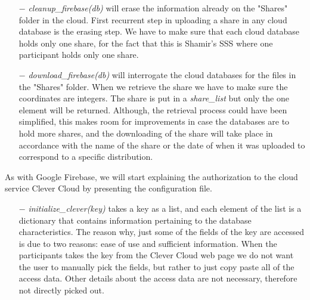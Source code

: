 \documentclass[12pt, a4paper, oneside]{book}
\begin{document}
    \vspace{-0.5cm}
    \begin{itemize}
        \item[$-$] {\it cleanup\_firebase(db)} will erase the information already on the "Shares" folder in the cloud. First recurrent step in uploading a share in any cloud database is the erasing step. We have to make sure that each cloud database holds only one share, for the fact that this is Shamir's SSS where one participant holds only one share.
    \end{itemize}
    \vspace{-0.5cm}
    \begin{itemize}
        \item[$-$] {\it download\_firebase(db)} will interrogate the cloud databases for the files in the "Shares" folder. When we retrieve the share we have to make sure the coordinates are integers. The share is put in a {\it share\_list} but only the one element will be returned. Although, the retrieval process could have been simplified, this makes room for improvements in case the databases are to hold more shares, and the downloading of the share will take place in accordance with the name of the share or the date of when it was uploaded to correspond to a specific distribution.
    \end{itemize}
    
    As with Google Firebase, we will start explaining the authorization to the cloud service Clever Cloud by presenting the configuration file.
    \vspace{-0.5cm}
    \begin{itemize}
        \item[$-$] {\it initialize\_clever(key)} takes a key as a list, and each element of the list is a dictionary that contains information pertaining to the database characteristics. The reason why, just some of the fields of the key are accessed is due to two reasons: ease of use and sufficient information. When the participants takes the key from the Clever Cloud web page we do not want the user to manually pick the fields, but rather to just copy paste all of the access data. Other details about the access data are not necessary, therefore not directly picked out.
    \end{itemize}
    
\end{document}
